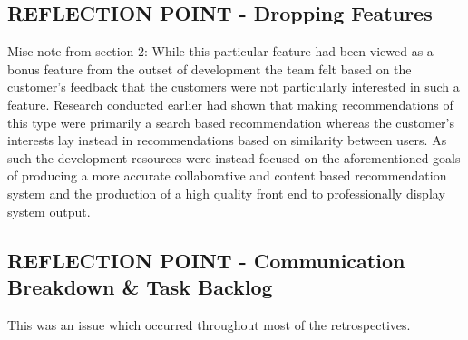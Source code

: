 \documentclass{l3proj}
\begin{document}


\subsection{REFLECTION POINT - Dropping Features}
\label{sec:droppingreflection}

Misc note from section 2:
While this particular feature had been viewed as a bonus feature from the outset of development the team felt based on the customer’s feedback that the customers were not particularly interested in such a feature. Research conducted earlier had shown that making recommendations of this type were primarily a search based recommendation whereas the customer’s interests lay instead in recommendations based on similarity between users. As such the development resources were instead focused on the aforementioned goals of producing a more accurate collaborative and content based recommendation system and the production of a high quality front end to professionally display system output. 


\subsection{REFLECTION POINT - Communication Breakdown \& Task Backlog}
\label{sec:communicationbreakdown}
This was an issue which occurred throughout most of the retrospectives.
\end{document}
